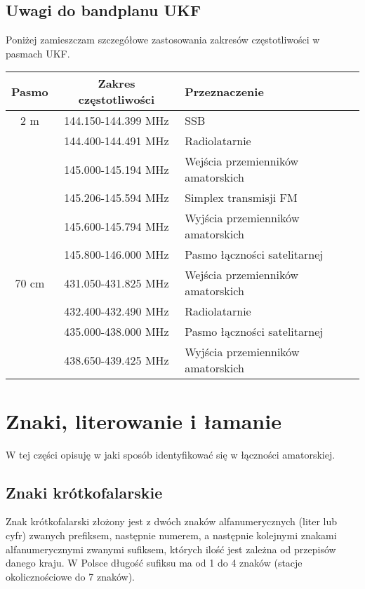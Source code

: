 \documentclass[a4paper,11pt]{article}
\begin{document}
\subsection{Uwagi do bandplanu UKF}
Poniżej zamieszczam szczegółowe zastosowania zakresów częstotliwości w pasmach UKF.
\begin{center}
\begin{tabular}{| c | c | p{8cm} |}
\hline
\textbf{Pasmo} & \textbf{Zakres częstotliwości} & \textbf{Przeznaczenie} \\ \hline
2 m & 144.150-144.399 MHz & SSB \\ \cline{2-3}
 & 144.400-144.491 MHz & Radiolatarnie \\ \cline{2-3}
 & 145.000-145.194 MHz & Wejścia przemienników amatorskich \\ \cline{2-3}
 & 145.206-145.594 MHz & Simplex transmisji FM \\ \cline{2-3}
 & 145.600-145.794 MHz & Wyjścia przemienników amatorskich \\ \cline{2-3}
 & 145.800-146.000 MHz & Pasmo łączności satelitarnej \\ \hline
70 cm & 431.050-431.825 MHz & Wejścia przemienników amatorskich \\ \cline{2-3}
 & 432.400-432.490 MHz & Radiolatarnie \\ \cline{2-3}
 & 435.000-438.000 MHz & Pasmo łączności satelitarnej \\ \cline{2-3}
 & 438.650-439.425 MHz & Wyjścia przemienników amatorskich \\ \hline
\end{tabular}
\end{center}
\section{Znaki, literowanie i łamanie}
W tej części opisuję w jaki sposób identyfikować się w łączności amatorskiej.
\subsection{Znaki krótkofalarskie}
Znak krótkofalarski złożony jest z dwóch znaków alfanumerycznych (liter lub cyfr) zwanych prefiksem, następnie numerem, a następnie kolejnymi znakami alfanumerycznymi zwanymi sufiksem, których ilość jest zależna od przepisów danego kraju. W Polsce długość sufiksu ma od 1 do 4 znaków (stacje okolicznościowe do 7 znaków).
\end{document}
